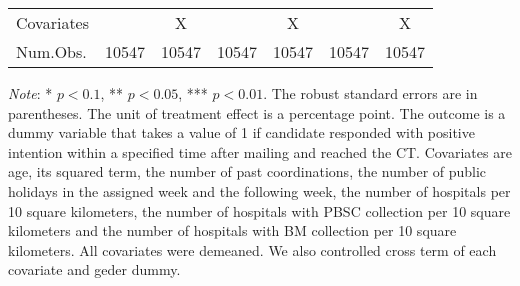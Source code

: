 \documentclass[12pt, a4paper]{article}
\begin{document}
\begin{table}[H]
\begin{threeparttable}
\begin{tabular}[t]{lcccccc}
\midrule
Covariates &  & X &  & X &  & X\\
Num.Obs. & \num{10547} & \num{10547} & \num{10547} & \num{10547} & \num{10547} & \num{10547}\\
\bottomrule
\end{tabular}
\begin{tablenotes}
\item \emph{Note}: * $p < 0.1$, ** $p < 0.05$, *** $p < 0.01$. The robust standard errors are in parentheses. The unit of treatment effect is a percentage point. The outcome is a dummy variable that takes a value of 1 if candidate responded with positive intention within a specified time after mailing and reached the CT. Covariates are age, its squared term, the number of past coordinations, the number of public holidays in the assigned week and the following week, the number of hospitals per 10 square kilometers, the number of hospitals with PBSC collection per 10 square kilometers and the number of hospitals with BM collection per 10 square kilometers. All covariates were demeaned. We also controlled cross term of each covariate and geder dummy.
\end{tablenotes}
\end{threeparttable}
\end{table}
\end{document}
